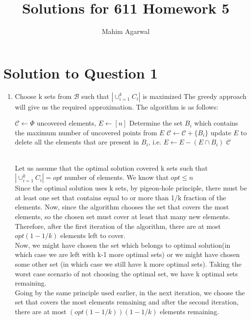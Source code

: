 \documentclass[11pt]{article}
\title{Solutions for 611 Homework 5}
\author{Mahim Agarwal}
\begin{document}
\maketitle

\section{Solution to Question 1}

\begin{enumerate}
    \item Choose k sets from $\mathcal{B}$ such that $|{\cup_{i=1}^k C_i}|$ is maximized \newline
    The greedy approach will give us the required approximation. The algorithm is as follows:
    \begin{algorithm}
  \begin{algorithmic}
      \State $\mathcal{C} \leftarrow \Phi$
      \State uncovered elements, $E \leftarrow [n]$
          \State Determine the set $B_i$ which contains the maximum number of uncovered points from $E$
          \State $\mathcal{C} \leftarrow \mathcal{C} + \{B_i\}$
          \State update $E$ to delete all the elements that are present in $B_i$, i.e. $E \leftarrow E - (E \cap B_i)$
      \EndWhile
      \State \Return $\mathcal{C}$
    \EndFunction
  \end{algorithmic}
\end{algorithm}\\
Let us assume that the optimal solution covered k sets such that $|{\cup_{i=1}^k C_i}| = opt $ number of elements. We know that $opt \leq n$ \\
Since the optimal solution uses k sets, by pigeon-hole principle, there must be at least one set that contains equal to or more than 1/k fraction of the elements. Now, since the algorithm chooses the set that covers the most elements, so the chosen set must cover at least that many new elements. Therefore, after the first iteration of the algorithm, there are at most $opt(1 - 1/k)$ elements left to cover. \\
Now, we might have chosen the set which belongs to optimal solution(in which case we are left with k-1 more optimal sets) or we might have chosen some other set (in which case we still have k more optimal sets). Taking the worst case scenario of not choosing the optimal set, we have k optimal sets remaining.\\
Going by the same principle used earlier, in the next iteration, we choose the set that covers the most elements remaining and after the second iteration, there are at most $(opt(1 - 1/k))(1 - 1/k)$ elements remaining. \\

\end{enumerate}
\end{document}
